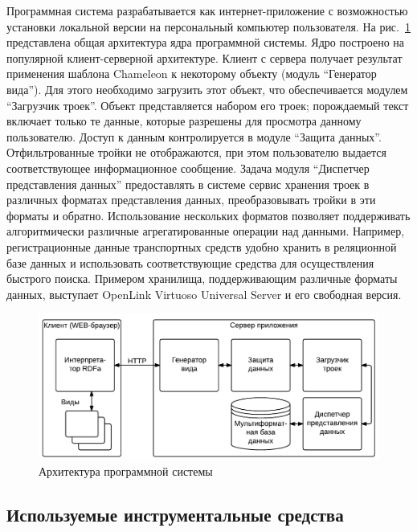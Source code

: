\documentclass[utf8]{../IncArticle}
\begin{document}
Программная система разрабатывается как интернет-приложение с
возможностью установки локальной версии на персональный компьютер
пользователя.  На рис.~\ref{architecture} представлена общая
архитектура ядра программной системы.  Ядро построено на популярной
клиент-серверной архитектуре.  Клиент с сервера получает результат
применения шаблона Chameleon к некоторому объекту (модуль ``Генератор
вида'').  Для этого необходимо загрузить этот объект, что
обеспечивается модулем ``Загрузчик троек''.  Объект представляется
набором его троек; порождаемый текст включает только те данные,
которые разрешены для просмотра данному пользователю.  Доступ к данным
контролируется в модуле ``Защита данных''.  Отфильтрованные тройки не
отображаются, при этом пользователю выдается соответствующее
информационное сообщение.  Задача модуля ``Диспетчер представления
данных'' предоставлять в системе сервис хранения троек в различных
форматах представления данных, преобразовывать тройки в эти форматы и
обратно.  Использование нескольких форматов позволяет поддерживать
алгоритмически различные агрегатированные операции над данными.
Например, регистрационные данные транспортных средств удобно хранить в
реляционной базе данных и использовать соответствующие средства для
осуществления быстрого поиска.  Примером хранилища, поддерживающим
различные форматы данных, выступает OpenLink Virtuoso Universal Server
\cite{b2:8} и его свободная версия.

\begin{figure}[!t]
\centering
\includegraphics[width=0.8\linewidth]{peixe-architecture-ru-1.pdf}
\caption{Архитектура программной системы}
\label{architecture}
\end{figure}

\subsection{Используемые инструментальные средства}
\label{sec:instr}
\end{document}
